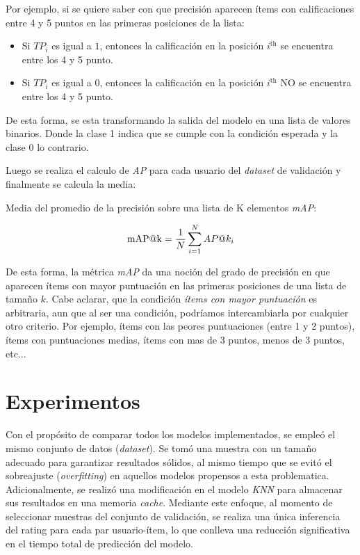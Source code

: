 \documentclass[11pt,a4paper,twoside]{thesis}
\begin{document}
Por ejemplo, si se quiere saber con que precisión aparecen ítems con
calificaciones entre 4 y 5 puntos en las primeras posiciones de la lista:

\begin{itemize}
	\item Si $TP_i$ es igual a $1$, entonces la calificación en la posición
	      $i^\mathrm{th}$ se encuentra entre los 4 y 5 punto.
	\item Si $TP_i$ es igual a $0$, entonces la calificación en la posición
	      $i^\mathrm{th}$ NO se encuentra entre los 4 y 5 punto.
\end{itemize}

De esta forma, se esta transformando la salida del modelo en una lista de
valores binarios. Donde la clase 1 indica que se cumple con la condición
esperada y la clase 0 lo contrario.

Luego se realiza el calculo de \textit{AP\makeatletter@k} para cada usuario del
\textit{dataset} de validación y finalmente se calcula la media:

\begin{description}
	\item[Media del promedio de la precisión sobre una lista de K elementos
	\textit{mAP\makeatletter@k}:]
\end{description}
\begin{equation}
	\operatorname{mAP\makeatletter@k}=\frac{1}{N} \sum_{i=1}^N AP\makeatletter@k_i
\end{equation}

De esta forma, la métrica \textit{mAP\makeatletter@k} da una noción del grado
de precisión en que aparecen ítems con mayor puntuación en las primeras
posiciones de una lista de tamaño $k$. Cabe aclarar, que la condición
\textit{ítems con mayor puntuación} es arbitraria, aun que al ser una
condición, podríamos intercambiarla por cualquier otro criterio. Por ejemplo,
ítems con las peores puntuaciones (entre 1 y 2 puntos), ítems con puntuaciones
medias, ítems con mas de 3 puntos, menos de 3 puntos, etc...

\chapter{Experimentos}

Con el propósito de comparar todos los modelos implementados, se empleó el
mismo conjunto de datos (\textit{dataset}). Se tomó una muestra con un tamaño
adecuado para garantizar resultados sólidos, al mismo tiempo que se evitó el
sobreajuste (\textit{overfitting}) en aquellos modelos propensos a esta
problematica. Adicionalmente, se realizó una modificación en el modelo
\textit{KNN} para almacenar sus resultados en una memoria \textit{cache}.
Mediante este enfoque, al momento de seleccionar muestras del conjunto de
validación, se realiza una única inferencia del rating para cada
par usuario-ítem, lo que conlleva una reducción significativa en el tiempo
total de predicción del modelo.
\end{document}
